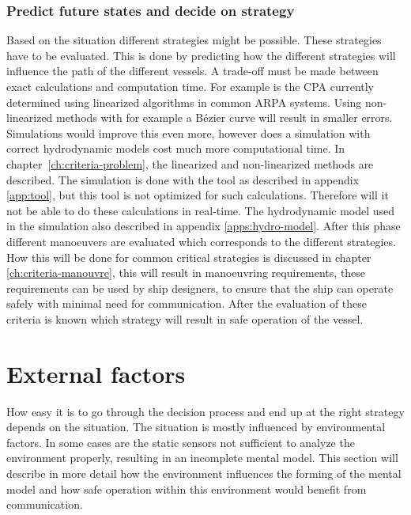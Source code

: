 \subsubsection{Predict future states and decide on strategy}
Based on the situation different strategies might be possible. These strategies have to be evaluated. This is done by predicting how the different strategies will influence the path of the different vessels. A trade-off must be made between exact calculations and computation time. For example is the \acf{CPA} currently determined using linearized algorithms in common \ac{ARPA} systems. Using non-linearized methods with for example a Bézier curve will result in smaller errors. Simulations would improve this even more, however does a simulation with correct hydrodynamic models cost much more computational time. In chapter~\ref{ch:criteria-problem}, the linearized and non-linearized methods are described. The simulation is done with the tool as described in appendix \ref{app:tool}, but this tool is not optimized for such calculations. Therefore will it not be able to do these calculations in real-time. The hydrodynamic model used in the simulation also described in appendix \ref{apps:hydro-model}. After this phase different manoeuvers are evaluated which corresponds to the different strategies. How this will be done for common critical strategies is discussed in chapter \ref{ch:criteria-manouvre}, this will result in manoeuvring requirements, these requirements can be used by ship designers, to ensure that the ship can operate safely with minimal need for communication.
After the evaluation of these criteria is known which strategy will result in safe operation of the vessel.

\section{External factors}
How easy it is to go through the decision process and end up at the right strategy depends on the situation. The situation is mostly influenced by environmental factors. In some cases are the static sensors not sufficient to analyze the environment properly, resulting in an incomplete mental model. This section will describe in more detail how the environment influences the forming of the mental model and how safe operation within this environment would benefit from communication. 

